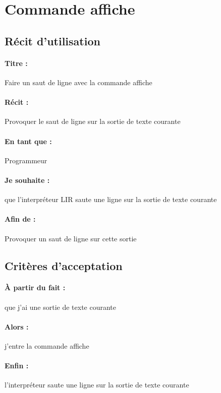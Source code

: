     \section{Commande affiche}

	\subsection*{Récit d'utilisation}

	\paragraph{Titre : } Faire un saut de ligne avec la commande affiche
	\paragraph{Récit : }  Provoquer le saut de ligne sur la sortie de texte courante
	\paragraph{En tant que : } Programmeur
	\paragraph{Je souhaite : } que l'interpréteur LIR saute une ligne sur la sortie de texte courante
	\paragraph{Afin de : } Provoquer un saut de ligne sur cette sortie

	\subsection*{Critères d'acceptation}

	\paragraph{À partir du fait : } que j'ai une sortie de texte courante
	\paragraph{Alors : } j'entre la commande affiche
	\paragraph{Enfin : } l'interpréteur saute une ligne sur la sortie de texte courante